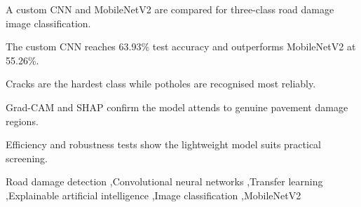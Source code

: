 \documentclass[preprint,12pt]{elsarticle}
\begin{document}
\begin{frontmatter}
\begin{graphicalabstract}
\end{graphicalabstract}

\begin{highlights}
\item A custom CNN and MobileNetV2 are compared for three-class road damage image classification.
\item The custom CNN reaches 63.93\% test accuracy and outperforms MobileNetV2 at 55.26\%.
\item Cracks are the hardest class while potholes are recognised most reliably.
\item Grad-CAM and SHAP confirm the model attends to genuine pavement damage regions.
\item Efficiency and robustness tests show the lightweight model suits practical screening.
\end{highlights}

\begin{keyword}
Road damage detection \sep Convolutional neural networks \sep Transfer learning \sep Explainable artificial intelligence \sep Image classification \sep MobileNetV2
\end{keyword}

\end{frontmatter}

\linenumbers

\end{document}
